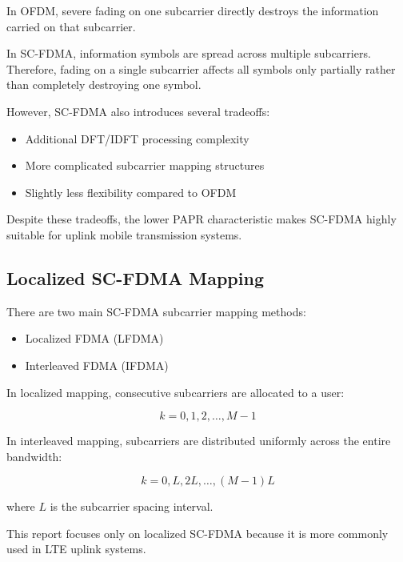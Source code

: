 In OFDM, severe fading on one subcarrier directly destroys the information
carried on that subcarrier.

In SC-FDMA, information symbols are spread across multiple subcarriers.
Therefore, fading on a single subcarrier affects all symbols only
partially rather than completely destroying one symbol.

However, SC-FDMA also introduces several tradeoffs:

\begin{itemize}
    \item Additional DFT/IDFT processing complexity
    \item More complicated subcarrier mapping structures
    \item Slightly less flexibility compared to OFDM
\end{itemize}

Despite these tradeoffs, the lower PAPR characteristic makes SC-FDMA
highly suitable for uplink mobile transmission systems.

\subsection{Localized SC-FDMA Mapping}

There are two main SC-FDMA subcarrier mapping methods:

\begin{itemize}
    \item Localized FDMA (LFDMA)
    \item Interleaved FDMA (IFDMA)
\end{itemize}

In localized mapping, consecutive subcarriers are allocated to a user:

\begin{equation}
k = 0,1,2,\dots,M-1
\end{equation}

In interleaved mapping, subcarriers are distributed uniformly across the
entire bandwidth:

\begin{equation}
k = 0,L,2L,\dots,(M-1)L
\end{equation}

where $L$ is the subcarrier spacing interval.

This report focuses only on localized SC-FDMA because it is more commonly
used in LTE uplink systems.

\vspace{0.3cm}

